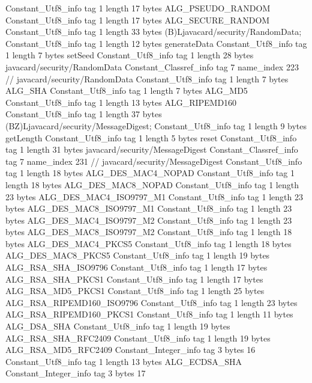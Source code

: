 {{{		}
		Constant_Utf8_info {
			tag	1
			length	17
			bytes	ALG_PSEUDO_RANDOM
		}
		Constant_Utf8_info {
			tag	1
			length	17
			bytes	ALG_SECURE_RANDOM
		}
		Constant_Utf8_info {
			tag	1
			length	33
			bytes	(B)Ljavacard/security/RandomData;
		}
		Constant_Utf8_info {
			tag	1
			length	12
			bytes	generateData
		}
		Constant_Utf8_info {
			tag	1
			length	7
			bytes	setSeed
		}
		Constant_Utf8_info {
			tag	1
			length	28
			bytes	javacard/security/RandomData
		}
		Constant_Classref_info {
			tag	7
			name_index	223		// javacard/security/RandomData
		}
		Constant_Utf8_info {
			tag	1
			length	7
			bytes	ALG_SHA
		}
		Constant_Utf8_info {
			tag	1
			length	7
			bytes	ALG_MD5
		}
		Constant_Utf8_info {
			tag	1
			length	13
			bytes	ALG_RIPEMD160
		}
		Constant_Utf8_info {
			tag	1
			length	37
			bytes	(BZ)Ljavacard/security/MessageDigest;
		}
		Constant_Utf8_info {
			tag	1
			length	9
			bytes	getLength
		}
		Constant_Utf8_info {
			tag	1
			length	5
			bytes	reset
		}
		Constant_Utf8_info {
			tag	1
			length	31
			bytes	javacard/security/MessageDigest
		}
		Constant_Classref_info {
			tag	7
			name_index	231		// javacard/security/MessageDigest
		}
		Constant_Utf8_info {
			tag	1
			length	18
			bytes	ALG_DES_MAC4_NOPAD
		}
		Constant_Utf8_info {
			tag	1
			length	18
			bytes	ALG_DES_MAC8_NOPAD
		}
		Constant_Utf8_info {
			tag	1
			length	23
			bytes	ALG_DES_MAC4_ISO9797_M1
		}
		Constant_Utf8_info {
			tag	1
			length	23
			bytes	ALG_DES_MAC8_ISO9797_M1
		}
		Constant_Utf8_info {
			tag	1
			length	23
			bytes	ALG_DES_MAC4_ISO9797_M2
		}
		Constant_Utf8_info {
			tag	1
			length	23
			bytes	ALG_DES_MAC8_ISO9797_M2
		}
		Constant_Utf8_info {
			tag	1
			length	18
			bytes	ALG_DES_MAC4_PKCS5
		}
		Constant_Utf8_info {
			tag	1
			length	18
			bytes	ALG_DES_MAC8_PKCS5
		}
		Constant_Utf8_info {
			tag	1
			length	19
			bytes	ALG_RSA_SHA_ISO9796
		}
		Constant_Utf8_info {
			tag	1
			length	17
			bytes	ALG_RSA_SHA_PKCS1
		}
		Constant_Utf8_info {
			tag	1
			length	17
			bytes	ALG_RSA_MD5_PKCS1
		}
		Constant_Utf8_info {
			tag	1
			length	25
			bytes	ALG_RSA_RIPEMD160_ISO9796
		}
		Constant_Utf8_info {
			tag	1
			length	23
			bytes	ALG_RSA_RIPEMD160_PKCS1
		}
		Constant_Utf8_info {
			tag	1
			length	11
			bytes	ALG_DSA_SHA
		}
		Constant_Utf8_info {
			tag	1
			length	19
			bytes	ALG_RSA_SHA_RFC2409
		}
		Constant_Utf8_info {
			tag	1
			length	19
			bytes	ALG_RSA_MD5_RFC2409
		}
		Constant_Integer_info {
			tag	3
			bytes	16
		}
		Constant_Utf8_info {
			tag	1
			length	13
			bytes	ALG_ECDSA_SHA
		}
		Constant_Integer_info {
			tag	3
			bytes	17
}}}
